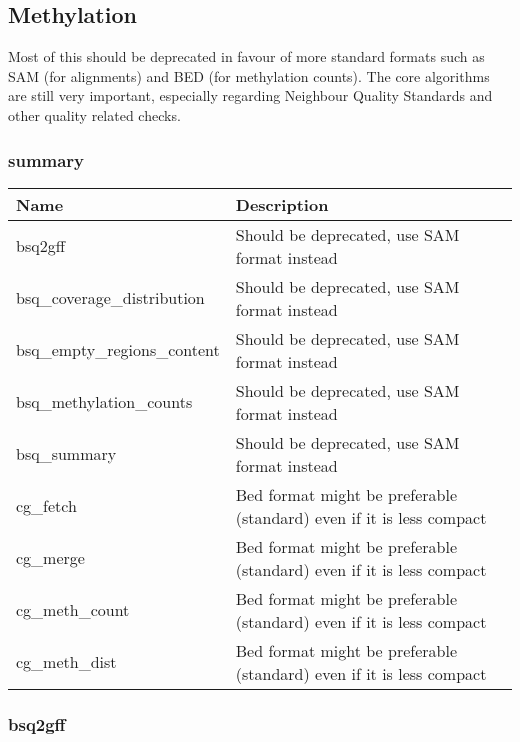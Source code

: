 \documentclass[a4paper,12pt]{article}
\begin{document}

\subsection{Methylation}

Most of this should be deprecated in favour of more standard formats such as
SAM (for alignments) and BED (for methylation counts).
The core algorithms are still very important, especially regarding Neighbour
Quality Standards and other quality related checks.

\subsubsection{summary}

\begin{tabularx}{\textwidth}{|X|X|}
    \hline
    \textbf{Name}                   & \textbf{Description} \\
    \hline
    \hline
    bsq2gff                         & Should be deprecated, use SAM format instead \\
    bsq\_coverage\_distribution     & Should be deprecated, use SAM format instead \\
    bsq\_empty\_regions\_content    & Should be deprecated, use SAM format instead \\
    bsq\_methylation\_counts        & Should be deprecated, use SAM format instead \\
    bsq\_summary                    & Should be deprecated, use SAM format instead \\
    cg\_fetch                       & Bed format might be preferable (standard) even if it is less compact \\
    cg\_merge                       & Bed format might be preferable (standard) even if it is less compact \\
    cg\_meth\_count                 & Bed format might be preferable (standard) even if it is less compact \\
    cg\_meth\_dist                  & Bed format might be preferable (standard) even if it is less compact \\
    \hline
\end{tabularx}

\subsubsection{bsq2gff}
\end{document}

